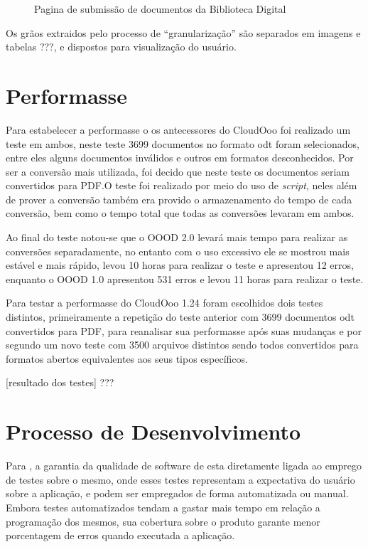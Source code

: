 \begin{figure}[ht]
    \centering
    \caption{Pagina de submissão de documentos da Biblioteca Digital}
    \label{granulate}
\end{figure}

Os grãos extraidos pelo processo de ``granularização'' são separados em imagens e tabelas ???, e dispostos para visualização do usuário.

\section{Performasse}

Para estabelecer a performasse o os antecessores do CloudOoo foi realizado um teste em ambos, neste teste 3699 documentos no formato odt foram selecionados, entre eles alguns documentos inválidos e outros em formatos desconhecidos. Por ser a conversão mais utilizada, foi decido que neste teste os documentos seriam convertidos para PDF.O teste foi realizado por meio do uso de \textit{script}, neles além de prover a conversão também era provido o armazenamento do tempo de cada conversão, bem como o tempo total que todas as conversões levaram em ambos.

Ao final do teste notou-se que o OOOD 2.0 levará mais tempo para realizar as conversões separadamente, no entanto com o uso excessivo ele se mostrou mais estável e mais rápido, levou 10 horas para realizar o teste e apresentou 12 erros, enquanto o OOOD 1.0 apresentou 531 erros e levou 11 horas para realizar o teste.

Para testar a performasse do CloudOoo 1.24 foram escolhidos dois testes distintos, primeiramente a repetição do teste anterior com 3699 documentos odt convertidos para PDF, para reanalisar sua performasse após suas mudanças e por segundo um novo teste com 3500 arquivos distintos sendo todos convertidos para formatos abertos equivalentes aos seus tipos específicos.

[resultado dos testes] ???

\section{Processo de Desenvolvimento}

Para \cite{PRESSMAN}, a garantia da qualidade de software de esta diretamente ligada ao emprego de testes sobre o mesmo, onde esses testes representam a expectativa do usuário sobre a aplicação, e podem ser empregados de forma automatizada ou manual. Embora testes automatizados tendam a gastar mais tempo em relação a programação dos mesmos, sua cobertura sobre o produto garante menor porcentagem de erros quando executada a aplicação.

